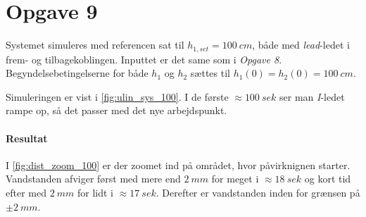 \section{Opgave 9}
	Systemet simuleres med referencen sat til $h_{1,set} = 100~cm$, både med
	\emph{lead}-ledet i frem- og tilbagekoblingen. Inputtet er det same som i
	\emph{Opgave 8}. Begyndelsebetingelserne for både $h_1$ og $h_2$ sættes til
	$h_1(0) = h_2(0) = 100~cm$.
	
	Simuleringen er vist i \ref{fig:ulin_sys_100}. I de første $\approx 100~sek$
	ser man \emph{I}-ledet rampe op, så det passer med det nye arbejdspunkt.
	
\paragraph{Resultat}
	I \ref{fig:dist_zoom_100} er der zoomet ind på området, hvor påvirknignen
	starter. Vandstanden afviger først med mere end $2~mm$ for meget i $\approx
	18~sek$ og kort tid efter med $2~mm$ for lidt i $\approx
	17~sek$. Derefter er vandstanden inden for grænsen på $\pm 2~mm$.
	
